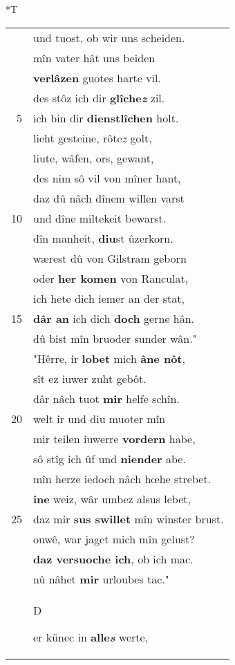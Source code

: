 \documentclass[8pt,a4paper,notitlepage]{article}
\begin{document}
\begin{table}[ht]
\begin{minipage}[t]{0.5\linewidth}
\small
\begin{center}*T
\end{center}
\begin{tabular}{rl}
 & und tuost, ob wir uns scheiden.\\ 
 & mîn vater hât uns beiden\\ 
 & \textbf{verlâzen} guotes harte vil.\\ 
 & des stôz ich dir \textbf{glîche\textit{z}} zil.\\ 
5 & ich bin dir \textbf{dienstlîchen} holt.\\ 
 & lieht gesteine, rôte\textit{z} golt,\\ 
 & liute, wâfen, ors, gewant,\\ 
 & des nim sô vil von mîner hant,\\ 
 & daz dû nâch dînem willen varst\\ 
10 & und dîne miltekeit bewarst.\\ 
 & dîn manheit, \textbf{diu}st ûzerkorn.\\ 
 & wærest dû von Gilstram geborn\\ 
 & oder \textbf{her komen} von Ranculat,\\ 
 & ich hete dich iemer an der stat,\\ 
15 & \textbf{dâr an} ich dich \textbf{doch} gerne hân.\\ 
 & dû bist mîn bruoder sunder wân."\\ 
 & "Hêrre, ir \textbf{lobet} mich \textbf{âne nôt},\\ 
 & sît ez iuwer zuht gebôt.\\ 
 & dâr nâch tuot \textbf{mir} helfe schîn.\\ 
20 & welt ir und diu muoter mîn\\ 
 & mir teilen iuwerre \textbf{vordern} habe,\\ 
 & sô stîg ich ûf und \textbf{niender} abe.\\ 
 & mîn herze iedoch nâch hœhe strebet.\\ 
 & \textbf{ine} weiz, wâr umbez alsus lebet,\\ 
25 & daz mir \textbf{sus swillet} mîn winster brust.\\ 
 & ouwê, war jaget mich mîn gelust?\\ 
 & \textbf{daz versuoche ich}, ob ich mac.\\ 
 & nû nâhet \textbf{mir} urloubes tac."\\ 
 & \begin{large}D\end{large}er künec in \textbf{alle\textit{s}} werte,\\ 

\end{tabular}
\end{minipage}
\end{table}
\end{document}
